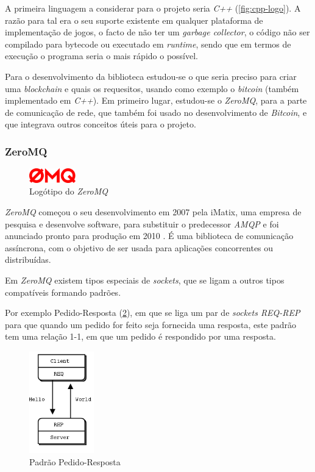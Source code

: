 A primeira linguagem a considerar para o projeto seria \textit{C++} (\cref{fig:cpp-logo}).
A razão para tal era o seu suporte existente em qualquer plataforma de implementação de jogos, o facto de não ter um \textit{garbage collector}, o código não ser compilado para bytecode ou executado em \textit{runtime}, sendo que em termos de execução o programa seria o mais rápido o possível.

Para o desenvolvimento da biblioteca estudou-se o que seria preciso para criar uma \textit{blockchain} e quais os requesitos, usando como exemplo o \textit{bitcoin} (também implementado em \textit{C++}). Em primeiro lugar, estudou-se o \textit{ZeroMQ}, para a parte de comunicação de rede, que também foi usado no desenvolvimento de \textit{Bitcoin}, e que integrava outros conceitos úteis para o projeto.

\subsubsection{ZeroMQ}
\begin{figure}
    \includegraphics[width=2cm]{images/zeromq/zeromq.png}
    \caption{Logótipo do \textit{ZeroMQ}}
    \label{fig:zeromq-logo}
\end{figure}

\textit{ZeroMQ}  começou o seu desenvolvimento em 2007 pela iMatix, uma empresa de pesquisa e desenvolve software, para substituir o predecessor \textit{AMQP} \cite{zeromq_origin} e foi anunciado pronto para produção em 2010 \cite{zeromq_mature}. É uma biblioteca de comunicação assíncrona, com o objetivo de ser usada para aplicações concorrentes ou distribuídas.

Em \textit{ZeroMQ} existem tipos especiais de \textit{sockets}, que se ligam a outros tipos compatíveis formando padrões. 

Por exemplo Pedido-Resposta (\cref{fig:zmq_req-rep}), em que se liga um par de \textit{sockets REQ-REP} para que quando um pedido for feito seja fornecida uma resposta, este padrão tem uma relação 1-1, em que um pedido é respondido por uma resposta.

\newpage

\begin{figure}[!ht]
    \centering
    \includegraphics[width=0.25\textwidth]{images/zeromq/req-rep.png}
    \caption{Padrão Pedido-Resposta}
    \label{fig:zmq_req-rep}
\end{figure}

